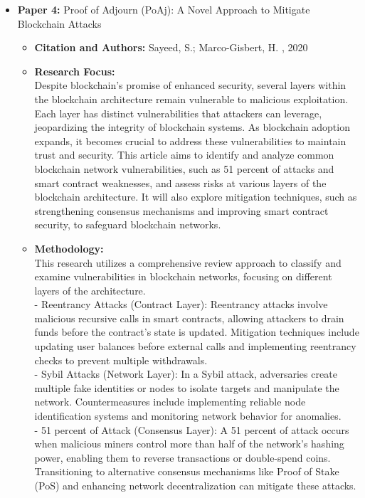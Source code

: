 \documentclass[12pt,a4paper]{article}
\begin{document}
\begin{itemize}
 \item \textbf{Paper 4:} Proof of Adjourn (PoAj): A Novel Approach to Mitigate
Blockchain Attacks
    \begin{itemize}
        \item \textbf{Citation and Authors:}
        Sayeed, S.; Marco-Gisbert, H. \cite{sayeed_2020_proof}, 2020
        \item \textbf{Research Focus:} 
        \\
Despite blockchain's promise of enhanced security, several layers within the blockchain
architecture remain vulnerable to malicious exploitation. Each layer has distinct vulnerabilities
that attackers can leverage, jeopardizing the integrity of blockchain systems. As blockchain
adoption expands, it becomes crucial to address these vulnerabilities to maintain trust and
security.
This article aims to identify and analyze common blockchain network vulnerabilities, such as
51 percent of attacks and smart contract weaknesses, and assess risks at various layers of the
blockchain architecture. It will also explore mitigation techniques, such as strengthening
consensus mechanisms and improving smart contract security, to safeguard blockchain
networks.
        \item \textbf{Methodology:} 
        \\
This research utilizes a comprehensive review approach to classify and examine vulnerabilities
in blockchain networks, focusing on different layers of the architecture.
\\
- Reentrancy Attacks (Contract Layer): Reentrancy attacks involve malicious recursive
calls in smart contracts, allowing attackers to drain funds before the contract’s state is
updated. Mitigation techniques include updating user balances before external calls and
implementing reentrancy checks to prevent multiple withdrawals.
\\
- Sybil Attacks (Network Layer): In a Sybil attack, adversaries create multiple fake
identities or nodes to isolate targets and manipulate the network. Countermeasures
include implementing reliable node identification systems and monitoring network
behavior for anomalies.
\\
- 51 percent of Attack (Consensus Layer): A 51 percent of attack occurs when malicious miners control
more than half of the network's hashing power, enabling them to reverse transactions or
double-spend coins. Transitioning to alternative consensus mechanisms like Proof of
Stake (PoS) and enhancing network decentralization can mitigate these attacks.
       

\end{itemize}
\end{itemize}
\end{document}

